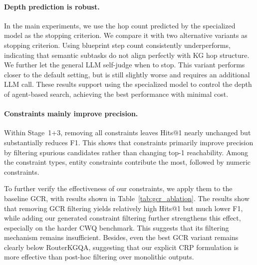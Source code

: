 \documentclass[11pt]{article}
\begin{document}
\paragraph{Depth prediction is robust.}
In the main experiments, we use the hop count predicted by the specialized model as the stopping criterion. We compare it with two alternative variants as stopping criterion. Using blueprint step count consistently underperforms, indicating that semantic subtasks do not align perfectly with KG hop structure. We further let the general LLM self-judge when to stop. This variant performs closer to the default setting, but is still slightly worse and requires an additional LLM call. These results support using the specialized model to control the depth of agent-based search, achieving the best performance with minimal cost.

\paragraph{Constraints mainly improve precision.}
Within Stage~1+3, removing all constraints leaves Hits@1 nearly unchanged but substantially reduces F1. This shows that constraints primarily improve precision by filtering spurious candidates rather than changing top-1 reachability. Among the constraint types, entity constraints contribute the most, followed by numeric constraints.

To further verify the effectiveness of our constraints, we apply them to the baseline GCR, with results shown in Table~\ref{tab:gcr_ablation}. The results show that removing GCR filtering yields relatively high Hits@1 but much lower F1, while adding our generated constraint filtering further strengthens this effect, especially on the harder CWQ benchmark. This suggests that its filtering mechanism remains insufficient. Besides, even the best GCR variant remains clearly below RouterKGQA, suggesting that our explicit CRP formulation is more effective than post-hoc filtering over monolithic outputs.

\begin{table}[t]
\centering
\small
\setlength{\tabcolsep}{2pt}
\caption{Reference comparison with GCR variants (\%). RouterKGQA is included for reference.}
\label{tab:gcr_ablation}
\end{table}
\end{document}
